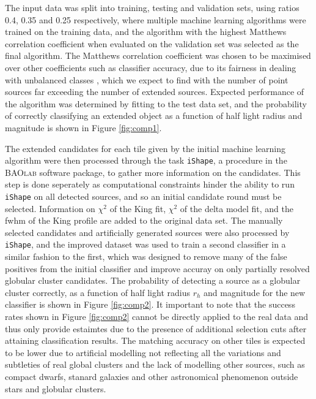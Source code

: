\documentclass[useAMS,usenatbib]{mn2e}
\begin{document}
The input data was split into training, testing and validation sets, using ratios 0.4, 0.35 and 0.25 respectively, where multiple machine learning algorithms were trained on the training data, and the algorithm with the highest Matthews correlation coefficient\citep{matthews1975comparison} when evaluated on the validation set was selected as the final algorithm. The Matthews correlation coefficient was chosen to be maximised over other coefficients such as classifier accuracy, due to its fairness in dealing with unbalanced classes \citep{Baldi2000, Jurman2012}, which we expect to find with the number of point sources far exceeding the number of extended sources. Expected performance of the algorithm was determined by fitting to the test data set, and the probability of correctly classifying an extended object as a function of half light radius and magnitude is shown in Figure \ref{fig:comp1}.

The extended candidates for each tile given by the initial machine learning algorithm were then processed through the task \verb|iShape|, a procedure in the \textsc{BAOlab} software package, to gather more information on the candidates. This step is done seperately as computational constraints hinder the ability to run \verb|iShape| on all detected sources, and so an initial candidate round must be selected. Information on $\chi^2$ of the King fit, $\chi^2$ of the delta model fit, and the fwhm of the King profile are added to the original data set. The manually selected candidates and artificially generated sources were also processed by \verb|iShape|, and the improved dataset was used to train a second classifier in a similar fashion to the first, which was designed to remove many of the false positives from the initial classifier and improve accuray on only partially resolved globular cluster candidates. The probability of detecting a source as a globular cluster correctly, as a function of half light radius $r_h$ and magnitude for the new classifier is shown in Figure \ref{fig:comp2}. It important to note that the success rates shown in Figure \ref{fig:comp2} cannot be directly applied to the real data and thus only provide estaimtes due to the presence of additional selection cuts after attaining classification results. The matching accuracy on other tiles is expected to be lower due to artificial modelling not reflecting all the variations and subtleties of real global clusters and the lack of modelling other sources, such as compact dwarfs, stanard galaxies and other astronomical phenomenon outside stars and globular clusters.\\
\end{document}
